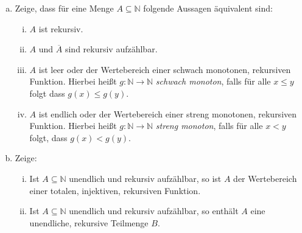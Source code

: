 \documentclass[german,headsepline]{scrartcl}
\theoremstyle{definition}
\begin{document}
	\begin{question}[subtitle={Blatt 13, 2015}]
		\begin{enumerate}[(a)]
			\item Zeige, dass für eine Menge $A\subseteq\mathbb{N}$ folgende Aussagen äquivalent sind:
				\begin{enumerate}[(i)]
					\item $A$ ist rekursiv.
					\item $A$ und $\overline{A}$ sind rekursiv aufzählbar.
					\item $A$ ist leer oder der Wertebereich einer schwach monotonen, rekursiven Funktion.
						Hierbei heißt $g:\mathbb{N}\to\mathbb{N}$ \emph{schwach monoton},
						falls für alle $x\leq y$ folgt dass $g(x)\leq g(y)$.
					\item $A$ ist endlich oder der Wertebereich einer streng monotonen, rekursiven Funktion.
						Hierbei heißt $g:\mathbb{N}\to\mathbb{N}$ \emph{streng monoton}, falls für alle $x<y$ folgt, dass $g(x)<g(y)$.
				\end{enumerate}
			\item Zeige:
				\begin{enumerate}[(i)]
					\item Ist $A\subseteq\mathbb{N}$ unendlich und rekursiv aufzählbar,
						so ist $A$ der Wertebereich einer totalen, injektiven, rekursiven Funktion.
					\item Ist $A\subseteq\mathbb{N}$ unendlich und rekursiv aufzählbar,
						so enthält $A$ eine unendliche, rekursive Teilmenge $B$.
				\end{enumerate}
		\end{enumerate}
	\end{question}
\end{document}
